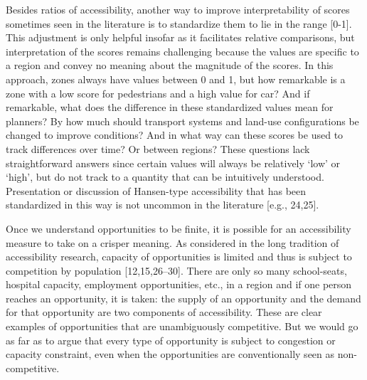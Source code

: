 \documentclass[10pt,letterpaper]{article}
\begin{document}
Besides ratios of accessibility, another way to improve interpretability
of scores sometimes seen in the literature is to standardize them to lie
in the range {[}0-1{]}. This adjustment is only helpful insofar as it
facilitates relative comparisons, but interpretation of the scores
remains challenging because the values are specific to a region and
convey no meaning about the magnitude of the scores. In this approach,
zones always have values between 0 and 1, but how remarkable is a zone
with a low score for pedestrians and a high value for car? And if
remarkable, what does the difference in these standardized values mean
for planners? By how much should transport systems and land-use
configurations be changed to improve conditions? And in what way can
these scores be used to track differences over time? Or between regions?
These questions lack straightforward answers since certain values will
always be relatively `low' or `high', but do not track to a quantity
that can be intuitively understood. Presentation or discussion of
Hansen-type accessibility that has been standardized in this way is not
uncommon in the literature {[}e.g., 24,25{]}.

Once we understand opportunities to be finite, it is possible for an
accessibility measure to take on a crisper meaning. As considered in the
long tradition of accessibility research, capacity of opportunities is
limited and thus is subject to competition by population
{[}12,15,26--30{]}. There are only so many school-seats, hospital
capacity, employment opportunities, etc., in a region and if one person
reaches an opportunity, it is taken: the supply of an opportunity and
the demand for that opportunity are two components of accessibility.
These are clear examples of opportunities that are unambiguously
competitive. But we would go as far as to argue that every type of
opportunity is subject to congestion or capacity constraint, even when
the opportunities are conventionally seen as non-competitive.
\end{document}
